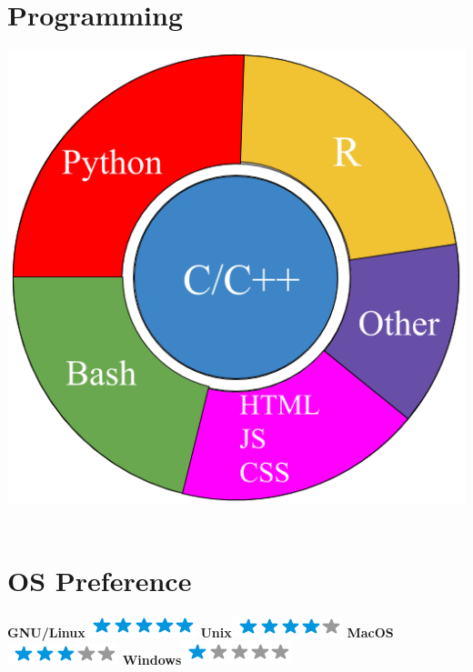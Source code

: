 \documentclass[]{friggeri-cv}
\begin{document}
\begin{aside}
  \section{Programming}
    \includegraphics[scale=0.2]{img/programming.png}
    ~
  \section{OS Preference}
    \textbf{GNU/Linux}\includegraphics[scale=0.40]{img/5stars.png}
    \textbf{Unix}\includegraphics[scale=0.40]{img/4stars.png}
    \textbf{MacOS}\includegraphics[scale=0.40]{img/3stars.png}
    \textbf{Windows}\includegraphics[scale=0.40]{img/1stars.png}
    ~
\end{aside}



\end{document}
